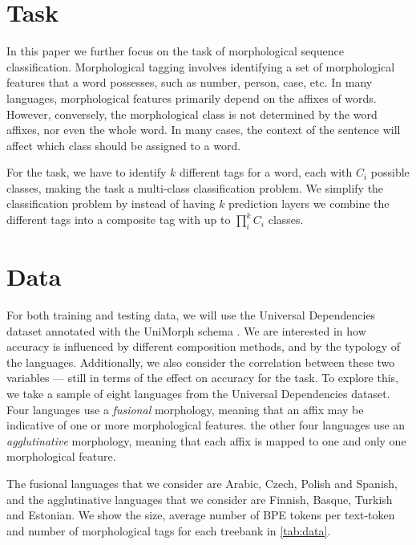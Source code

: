 \documentclass[11pt]{article}
\newcommand\citep{\cite}
\begin{document}
    \section{Task}
             In this paper we further focus on the task of
     morphological sequence classification. Morphological tagging
     involves identifying a set of morphological features that a word
     possesses, such as number, person, case, etc. In many languages,
     morphological features primarily depend on the affixes of
     words. However, conversely, the morphological class is not
     determined by the word affixes, nor even the whole word. In many
     cases, the context of the sentence will affect which class should
     be assigned to a word.

     For the task, we have to identify $k$ different tags for a word,
     each with $C_i$ possible classes, making the task a multi-class
     classification problem. We simplify the classification problem by
     instead of having $k$ prediction layers we combine the different
     tags into a composite tag with up to $\prod _i^k C_i$ classes.

    \section{Data}
    
    For both training and testing data, we will use the Universal
    Dependencies dataset \citep{nivre2018} annotated with the UniMorph
    schema \citep{mccarthy2018marrying}. We are interested in how
    accuracy is influenced by different composition methods, and by
    the typology of the languages. Additionally, we also consider the
    correlation between these two variables --- still in terms of the
    effect on accuracy for the task. To explore this, we take a sample
    of eight languages from the Universal Dependencies dataset. Four
    languages use a \textit{fusional} morphology, meaning that an
    affix may be indicative of one or more morphological features. the
    other four languages use an \textit{agglutinative} morphology,
    meaning that each affix is mapped to one and only one
    morphological feature.

    
           	The fusional languages that we consider are Arabic, Czech,
     Polish and Spanish, and the agglutinative languages that we
     consider are Finnish, Basque, Turkish and Estonian.  We show the
     size, average number of BPE tokens per text-token and number of
     morphological tags for each treebank in \cref{tab:data}.
    
\end{document}
